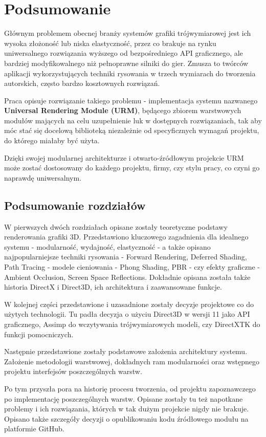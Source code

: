 \chapter{Podsumowanie}
Głównym problemem obecnej branży systemów grafiki trójwymiarowej jest ich wysoka złożoność lub niska elastyczność, przez co brakuje na rynku uniwersalnego rozwiązania wyższego od bezpośredniego API graficznego, ale bardziej modyfikowalnego niż pełnoprawne silniki do gier. Zmusza to twórców aplikacji wykorzystujących techniki rysowania w trzech wymiarach do tworzenia autorskich, często bardzo kosztownych rozwiązań.

Praca opisuje rozwiązanie takiego problemu - implementacja systemu nazwanego \textbf{Universal Rendering Module (URM)}, będącego zbiorem warstwowych modułów mających na celu uzupełnienie luk w dostępnych rozwiązaniach, tak aby móc stać się docelową biblioteką niezależnie od specyficznych wymagań projektu, do którego miałaby być użyta.

Dzięki swojej modularnej architekturze i otwarto-źródłowym projekcie URM może zostać dostosowany do każdego projektu, firmy, czy stylu pracy, co czyni go naprawdę uniwersalnym.

\section{Podsumowanie rozdziałów}
W pierwszych dwóch rozdziałach opisane zostały teoretyczne podstawy renderowania grafiki 3D. Przedstawiono kluczowego zagadnienia dla idealnego systemu - modularność, wydajność, elastyczność - a także opisano najpopularniejsze techniki rysowania - Forward Rendering, Deferred Shading, Path Tracing - modele cieniowania - Phong Shading, PBR - czy efekty graficzne - Ambient Occlusion, Screen Space Reflections. Dokładnie opisana została także historia DirectX i Direct3D, ich architektura i zaawansowane funkcje. 

W kolejnej części przedstawione i uzasadnione zostały decyzje projektowe co do użytych technologii. Tu padła decyzja o użyciu Direct3D w wersji 11 jako API graficznego, Assimp do wczytywania trójwymiarowych modeli, czy DirectXTK do funkcji pomocniczych. 

Następnie przedstawione zostały podstawowe założenia architektury systemu. Założenie metodologii warstwowej, dokładnych ram modularności oraz wstępnego projektu interfejsów poszczególnych warstw.

Po tym przyszła pora na historię procesu tworzenia, od projektu zapoznawczego po implementację poszczególnych warstw. Opisane zostały tu też napotkane problemy i ich rozwiązania, których w tak dużym projekcie nigdy nie brakuje. Opisano także szczegóły decyzji o opublikowaniu kodu źródłowego modułu na platformie GitHub. 

